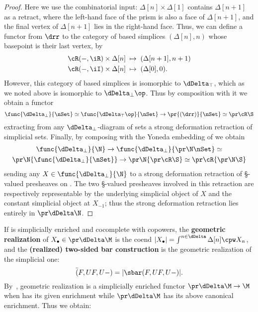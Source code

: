 \begin{proof}
  Here we use the combinatorial input: $\Delta[n]\times\Delta[1]$ contains $\Delta[n+1]$ as a retract, where the left-hand face of the prism is also a face of $\Delta[n+1]$, and the final vertex of $\Delta[n+1]$ lies in the right-hand face.
  Thus, we can define a functor from $\drr$ to the category of based simplices $(\Delta[n],n)$ whose basepoint is their last vertex, by
  \begin{align*}
    \cR(-,\iR)\times \Delta[n] &\;\mapsto\; (\Delta[n+1],n+1)\\
    \cR(-,\iI)\times \Delta[n] &\;\mapsto\; (\Delta[0],0).
  \end{align*}
  However, this category of based simplices is isomorphic to $\dDelta_\top$, which as we noted above is isomorphic to $\dDelta_\bot\op$.
  Thus by composition with it we obtain a functor
  \[ \func{\dDelta_\bot}{\nSet} \simeq \func{\dDelta_\top\op}{\nSet} \to \pr{(\drr)}{\nSet} \simeq \pr\cR\S \]
  extracting from any $\dDelta_\bot$-diagram of sets a strong deformation retraction of simplicial sets.
  Finally, by composing with the Yoneda embedding of \N we obtain
  \begin{multline*}
  \func{\dDelta_\bot}{\N} \to \func{\dDelta_\bot}{\pr\N\nSet}
    \simeq \\ \pr\N{\func{\dDelta_\bot}{\nSet}}
    \to \pr\N{\pr\cR\S} \simeq \pr\cR{\pr\N\S}
  \end{multline*}
  sending any $X\in\func{\dDelta_\bot}{\N}$ to a strong deformation retraction of \S-valued presheaves on \N.
  The two \S-valued presheaves involved in this retraction are respectively representable by the underlying simplicial object of $X$ and the constant simplicial object at $X_{-1}$; thus the strong deformation retraction lies entirely in $\pr\dDelta\N$.
\end{proof}

If \M is simplicially enriched and cocomplete with copowers, the \textbf{geometric realization} of $X_\bullet \in \pr\dDelta\M$ is the coend
\( |X_\bullet| = \int^{n\in\dDelta} \Delta[n] \cpw X_n \),
and the \textbf{(realized) two-sided bar construction} is the geometric realization of the simplicial one:
\[ \bar(F,UF,U-) = |\sbar(F,UF,U-)|. \]
By~\cite[Proposition 5.4]{rss:simp}, geometric realization is a simplicially enriched functor $\pr\dDelta\M \to \M$ when \M has its given enrichment while $\pr\dDelta\M$ has its above {canonical} enrichment. %
Thus we obtain:

